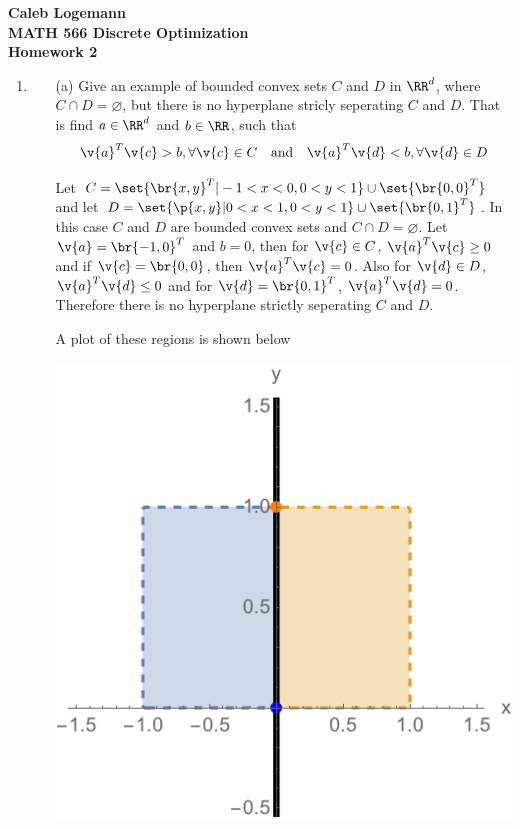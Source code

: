 \documentclass[11pt, oneside]{article}
\begin{document}
\noindent \textbf{\Large{Caleb Logemann \\
MATH 566 Discrete Optimization\\
Homework 2
}}

%
\begin{enumerate}
    \item %
        \begin{enumerate}
            \item[(a)]
                Give an example of bounded convex sets $C$ and $D$ in $\RR^d$,
                where $C \cap D = \varnothing$, but there is no hyperplane
                stricly seperating $C$ and $D$.
                That is find $a \in \RR^d$ and $b \in \RR$, such that
                \[
                    \v{a}^T\v{c} > b, \forall \v{c} \in C \quad \text{and} \quad \v{a}^T\v{d} < b, \forall \v{d} \in D
                \]

                Let $C = \set{\br{x, y}^T | -1 < x < 0, 0 < y < 1} \cup \set{\br{0, 0}^T}$
                and let $D = \set{\p{x, y} | 0 < x < 1, 0 < y < 1} \cup \set{\br{0, 1}^T}$.
                In this case $C$ and $D$ are bounded convex sets and $C \cap D = \varnothing$.
                Let $\v{a} = \br{-1, 0}^T$ and $b = 0$, then for $\v{c} \in C$,
                $\v{a}^T \v{c} \ge 0$ and if $\v{c} = \br{0, 0}$, then $\v{a}^T \v{c} = 0$.
                Also for $\v{d} \in D$, $\v{a}^T \v{d} \le 0$ and for $\v{d} = \br{0, 1}^T$,
                $\v{a}^T \v{d} = 0$.
                Therefore there is no hyperplane strictly seperating $C$ and $D$.

                A plot of these regions is shown below
                \begin{center}
                    \includegraphics[scale=.4]{Figures/02_2.png}
                \end{center}


\end{enumerate}
\end{enumerate}
\end{document}
